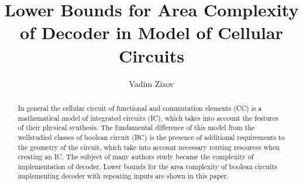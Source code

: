 \begin{englishtitle} %
\title{Lower Bounds for Area Complexity of Decoder in Model of Cellular Circuits}
\author{Vadim Zizov 
}

\maketitle

\begin{abstract}
In general the cellular circuit of functional and commutation elements (CC) is a mathematical model of integrated circuits (IC), which takes into account the features of their
physical synthesis. The fundamental difference of this model from the wellstudied classes of boolean circuit (BC) is the presence of additional requirements to the geometry of the circuit, which take into account necessary routing resources when creating an IC. The subject of many
authors study became the complexity of implementation of decoder. Lower bounds for the area complexity of boolean circuits implementing decoder with repeating inputs are
shown in this paper.

\end{abstract}
\end{englishtitle}

\iffalse
%
%

